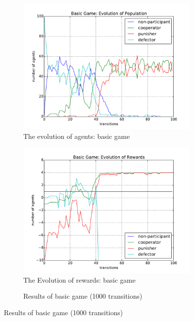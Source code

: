 \documentclass[11pt]{article}
\begin{document}
\begin{figure}[!h]
  \caption{Basic game}
  \begin{subfigure}{.5\textwidth}
    \centering
    \caption{The evolution of agents: basic game}
    \includegraphics[scale = 0.4]{1.pdf}
  \end{subfigure}
  \begin{subfigure}{.5\textwidth}
    \centering
    \caption{The Evolution of rewards: basic game}
    \includegraphics[scale = 0.4]{2.pdf}
  \end{subfigure}
  \begin{subfigure}{1\textwidth}
    \centering
    \caption{Results of basic game (1000 transitions)}

\end{subfigure}
\end{figure}
\end{document}
